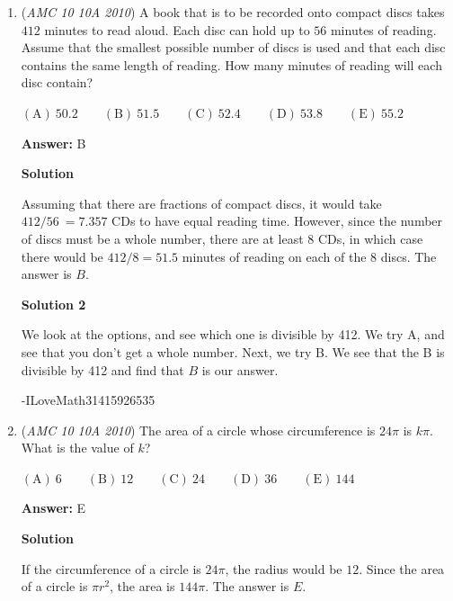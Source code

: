 \begin{enumerate}
 


 



\textbf{Solution 3}

Plug in the answer choices + some common sense. A and B presumably dont work because they are too low, so we start plugging in from C to E. We find $\boxed{D}$ as the answer.

 


	\item (\textit{AMC 10 10A 2010}) A book that is to be recorded onto compact discs takes $412$ minutes to read aloud. Each disc can hold up to $56$ minutes of reading. Assume that the smallest possible number of discs is used and that each disc contains the same length of reading. How many minutes of reading will each disc contain?


 $\mathrm{(A)}\ 50.2 \qquad \mathrm{(B)}\ 51.5 \qquad \mathrm{(C)}\ 52.4 \qquad \mathrm{(D)}\ 53.8 \qquad \mathrm{(E)}\ 55.2$

 \textbf{Answer: }B



\textbf{Solution}

Assuming that there are fractions of compact discs, it would take $412/56 ~= 7.357$ CDs to have equal reading time. However, since the number of discs must be a whole number, there are at least 8 CDs, in which case there would be $412/8 = 51.5$ minutes of reading on each of the 8 discs. The answer is $\boxed{B}$.

 



\textbf{Solution 2}

We look at the options, and see which one is divisible by 412. We try A, and see that you don't get a whole number. Next, we try B. We see that the B is divisible by 412 and find that $\boxed{B}$ is our answer.

 -ILoveMath31415926535

 


	\item (\textit{AMC 10 10A 2010}) The area of a circle whose circumference is $24\pi$ is $k\pi$. What is the value of $k$?


 $\mathrm{(A)}\ 6 \qquad \mathrm{(B)}\ 12 \qquad \mathrm{(C)}\ 24 \qquad \mathrm{(D)}\ 36 \qquad \mathrm{(E)}\ 144$

 \textbf{Answer: }E



\textbf{Solution}

If the circumference of a circle is $24\pi$, the radius would be $12$. Since the area of a circle is $\pi r^2$, the area is $144\pi$. The answer is $\boxed{E}$.


\end{enumerate}
